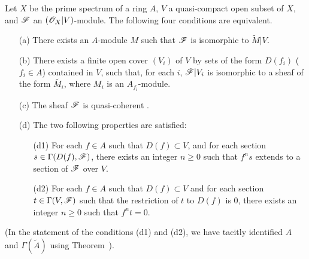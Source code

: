 \begin{theorem}[1.4.1]
\label{I.1.4.1}
Let $X$ be the prime spectrum of a ring $A$, $V$ a quasi-compact open subset of $X$, and $\mathscr{F}$ an $(\mathscr{O}_X|V)$-module.
The following four conditions are equivalent.
\begin{enumerate}
  \item[{\rm(a)}] There exists an $A$-module $M$ such that $\mathscr{F}$ is isomorphic to $\widetilde{M}|V$.
  \item[{\rm(b)}] There exists a finite open cover $(V_i)$ of $V$ by sets of the form $D(f_i)$ ($f_i\in A$) contained in $V$, such that, for each $i$, $\mathscr{F}|V_i$ is isomorphic to a sheaf of the form $\widetilde{M_i}$, where $M_i$ is an $A_{f_i}$-module.
  \item[{\rm(c)}] The sheaf $\mathscr{F}$ is quasi-coherent .
  \item[{\rm(d)}] The two following properties are satisfied:
    \begin{enumerate}
      \item[{\rm(d1)}] For each $f\in A$ such that $D(f)\subset V$, and for each section $s\in\Gamma(D(f),\mathscr{F})$, there exists an integer $n\geq 0$ such that $f^n s$ extends to a section of $\mathscr{F}$ over $V$.
      \item[{\rm(d2)}] For each $f\in A$ such that $D(f)\subset V$ and for each section $t\in\Gamma(V,\mathscr{F})$ such that the restriction of $t$ to $D(f)$ is $0$, there exists an integer $n\geq 0$ such that $f^n t=0$.
    \end{enumerate}
\end{enumerate}
\end{theorem}
(In the statement of the conditions (d1) and (d2), we have tacitly identified $A$ and $\Gamma(\widetilde{A})$ using Theorem~).

